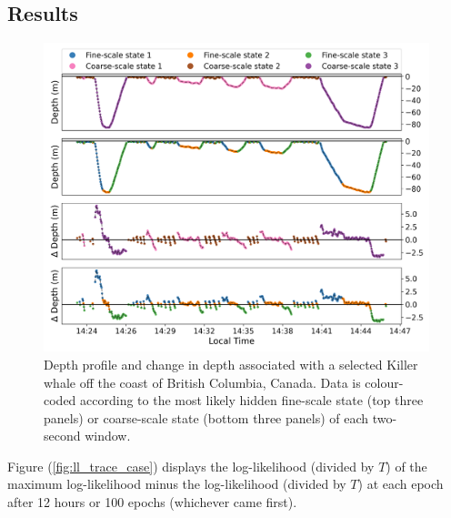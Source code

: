 \subsection{Results}
%
\begin{figure}
    \centering
    \includegraphics[width=6.5in]{plt/decoded_dives_kw_I107_K_3_3_nWhales_8.png}
    \caption{Depth profile and change in depth associated with a selected Killer whale off the coast of British Columbia, Canada. Data is colour-coded according to the most likely hidden fine-scale state (top three panels) or coarse-scale state (bottom three panels) of each two-second window.}
    \label{fig:data}
\end{figure}
%
Figure (\ref{fig:ll_trace_case}) displays the log-likelihood (divided by $T$) of the maximum log-likelihood minus the log-likelihood (divided by $T$) at each epoch after 12 hours or 100 epochs (whichever came first).
%
